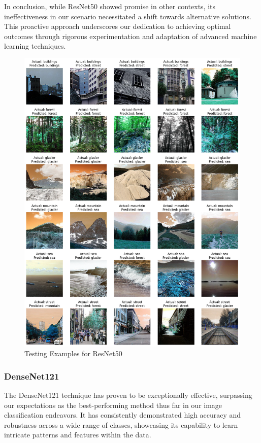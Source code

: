 \documentclass[conference]{IEEEtran}
\begin{document}
In conclusion, while ResNet50 showed promise in other contexts, its ineffectiveness in our scenario necessitated a shift towards alternative solutions. This proactive approach underscores our dedication to achieving optimal outcomes through rigorous experimentation and adaptation of advanced machine learning techniques.


\begin{figure}
    \centering
    \includegraphics[width=1\linewidth]{images//ResNet50/TestingExamplesResNet.png}
    \caption{Testing Examples for ResNet50}
    \label{fig:Examples_ResNet}
\end{figure}

\subsubsection{DenseNet121}

The DenseNet121 technique has proven to be exceptionally effective, surpassing our expectations as the best-performing method thus far in our image classification endeavors. It has consistently demonstrated high accuracy and robustness across a wide range of classes, showcasing its capability to learn intricate patterns and features within the data.
\end{document}
